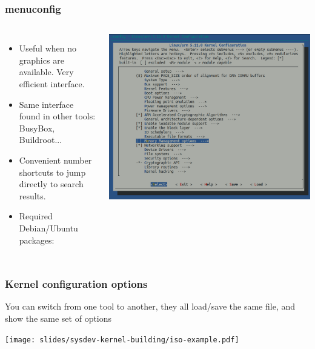 \begin{frame}
  \frametitle{menuconfig}
  \begin{columns}
    \begin{itemize}
      \item Useful when no graphics are available. Very efficient interface.
      \item Same interface found in other tools: BusyBox, Buildroot...
      \item Convenient number shortcuts to jump directly to search results.
      \item Required Debian/Ubuntu packages: 
    \end{itemize}
    \includegraphics[width=\textwidth]{slides/sysdev-kernel-building/menuconfig-screenshot.png}
  \end{columns}
\end{frame}

\begin{frame}
  \frametitle{Kernel configuration options}
  You can switch from one tool to another, they all load/save the same
   file, and show the same set of options
  \begin{center}
    \texttt{[image: slides/sysdev-kernel-building/iso-example.pdf]}
  \end{center}
\end{frame}

